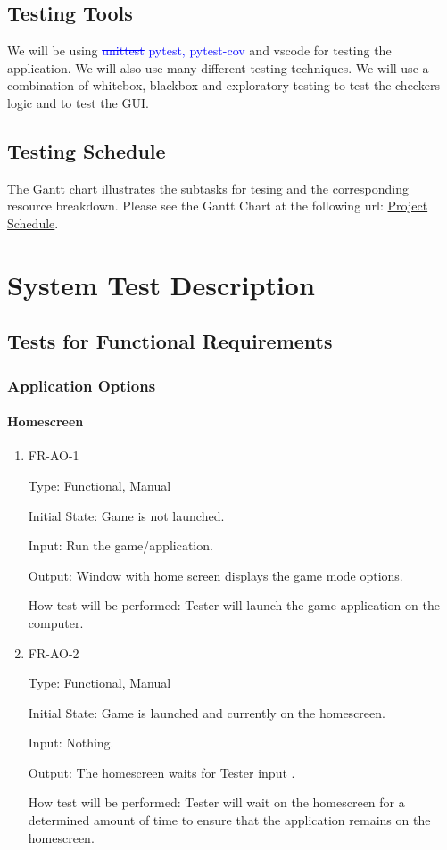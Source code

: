 \documentclass[12pt, titlepage]{article}
\begin{document}
\subsection{Testing Tools}
We will be using \textcolor{blue}{\sout{unittest} pytest, pytest-cov} and vscode for testing the application. We will also use many different testing techniques. We will use a combination of whitebox, blackbox and exploratory testing to test the checkers logic and to test the GUI.

\subsection{Testing Schedule}
The Gantt chart illustrates the subtasks for tesing and the corresponding resource breakdown.
Please see the Gantt Chart at the following url: \href{https://gitlab.cas.mcmaster.ca/bargea/3xa3-g09-2021/-/blob/master/BlankProjectTemplate/ProjectSchedule/3XA3\%20Group\%20Project.pdf}{Project Schedule}.

\section{System Test Description}
	
\subsection{Tests for Functional Requirements}

\subsubsection{Application Options}
		
\paragraph{Homescreen}
\begin{enumerate}
    \item{FR-AO-1}
    
    Type: Functional, Manual
    
    Initial State: Game is not launched.
    					
    Input: Run the game/application.
    					
    Output: Window with home screen displays the game mode options.
    					
    How test will be performed: Tester will launch the game application on the computer. 
    \item{FR-AO-2}
    
    Type: Functional, Manual
    					
    Initial State: Game is launched and currently on the homescreen.
    					
    Input: Nothing.
    					
    Output: The homescreen waits for Tester input .
    					
    How test will be performed: Tester will wait on the homescreen for a determined amount of time to ensure that the application remains on the homescreen. 
\end{enumerate}
\end{document}

